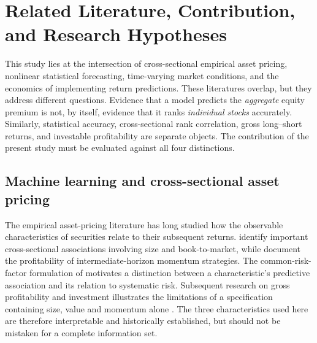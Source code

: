 \section{Related Literature, Contribution, and Research Hypotheses}
\label{sec:related-literature}

This study lies at the intersection of cross-sectional empirical asset pricing,
nonlinear statistical forecasting, time-varying market conditions, and the
economics of implementing return predictions. These literatures overlap, but
they address different questions. Evidence that a model predicts the
\emph{aggregate} equity premium is not, by itself, evidence that it ranks
\emph{individual stocks} accurately. Similarly, statistical accuracy,
cross-sectional rank correlation, gross long--short returns, and investable
profitability are separate objects. The contribution of the present study must
be evaluated against all four distinctions.

\subsection{Machine learning and cross-sectional asset pricing}
\label{subsec:literature-ml}

The empirical asset-pricing literature has long studied how the observable
characteristics of securities relate to their subsequent returns.
\cite{FamaFrench1992} identify important cross-sectional associations involving
size and book-to-market, while \cite{JegadeeshTitman1993} document the
profitability of intermediate-horizon momentum strategies.
The common-risk-factor formulation of \cite{FamaFrench1993} motivates a
distinction between a characteristic's predictive association and its relation
to systematic risk. Subsequent research on gross profitability and investment
illustrates the limitations of a specification containing size, value and
momentum alone \citep{NovyMarx2013,FamaFrench2015}. The three characteristics
used here are therefore interpretable and historically established, but should
not be mistaken for a complete information set.

